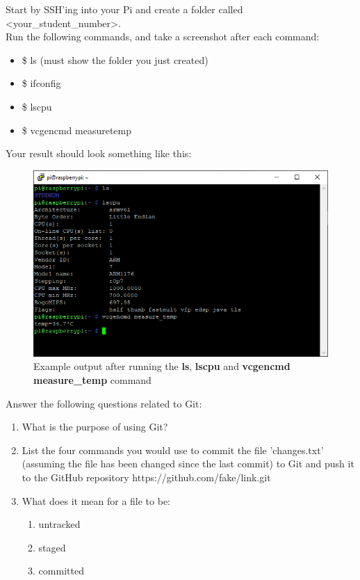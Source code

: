 Start by SSH'ing into your Pi and create a folder called \textless your\_student\_number\textgreater.\\
Run the following commands, and take a screenshot after each command:
\begin{itemize}
\itemsep0em 
    \item \$ ls (must show the folder you just created)
    \item \$ ifconfig
    \item \$ lscpu 
    \item \$ vcgencmd measure\textunderscore temp
\end{itemize}
Your result should look something like this:
\begin{figure}[H]
\centering
\includegraphics[width=0.8\columnwidth]{Figures/CMDOutput}
\caption{Example output after running the \textbf{ls}, \textbf{lscpu} and \textbf{vcgencmd measure\_temp} command}
\label{fig:CMDOutput}
\end{figure}

Answer the following questions related to Git:
\begin{enumerate}
    \item What is the purpose of using Git?
    \item List the four commands you would use to commit the file 'changes.txt' (assuming the file has been changed since the last commit) to Git and push it to the GitHub repository https://github.com/fake/link.git
    \item What does it mean for a file to be:
    \begin{enumerate}
        \item untracked
        \item staged
        \item committed
    \end{enumerate}
\end{enumerate}

